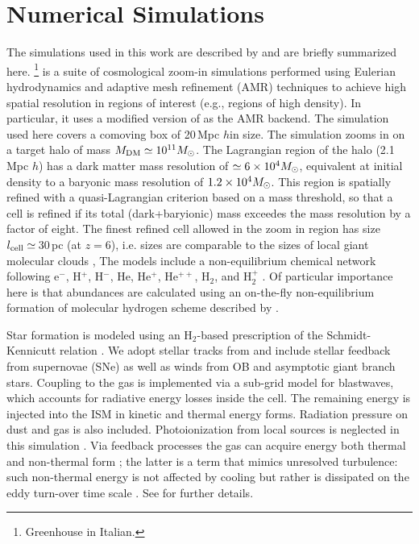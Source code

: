 \IfFileExists{emulateapjlegacy.cls}{\documentclass[iop]{emulateapjlegacy}}{\documentclass[iop]{emulateapj}}
\begin{document}
\section{Numerical Simulations}\label{sec:sim}
The simulations used in this work are described by \citealt{Pallottini17a, Pallottini17b} and are briefly summarized here.
%
\footnote{Greenhouse in Italian.} is a suite of cosmological zoom-in simulations performed using Eulerian hydrodynamics and adaptive mesh refinement (AMR) techniques to achieve high spatial resolution in regions of interest (e.g., regions of high density).
%
In particular, it uses a modified version of  \citep{Teyssier02a} as the AMR backend. The simulation used here covers a comoving box of 20\,Mpc $h$\pmOne in size. The simulation zooms in on a target halo of mass $M_{\rm DM}\simeq10^{11} \mbox{$M_{\odot}$}$. The Lagrangian region of the halo (2.1\,Mpc $h$\pmOne) has a dark matter mass resolution of $\simeq 6\times 10^4 \mbox{$M_{\odot}$}$, equivalent at initial density to a baryonic mass resolution of $1.2 \times 10^4 \mbox{$M_{\odot}$}$. This region is spatially refined with a quasi-Lagrangian criterion based on a mass threshold, so that a cell is refined if its total (dark+baryionic) mass exceedes the mass resolution by a factor of eight. The finest refined cell allowed in the zoom in region has size $l_{\rm cell}\simeq$\,30\,pc (at $z = 6$), i.e. sizes are comparable to the sizes of local giant molecular clouds \citep[e.g.,][]{Sanders85a, Federrath13a, Goodman14a},
The models include a non-equilibrium chemical network following e$^{-}$, H$^+$, H$^-$, He, He$^+$, He$^{++}$, H$_2$, and H$_2^+$ \citep{Grassi14a,Bovino16a}. Of particular importance here is that abundances are calculated using an on-the-fly non-equilibrium formation of molecular hydrogen scheme described by \citet{Pallottini17a}.

Star formation is modeled using an H$_2$-based prescription of the Schmidt-Kennicutt relation \citep{Krumholz09a}. We adopt stellar tracks from  and include stellar feedback from supernovae (SNe) as well as winds from OB and asymptotic giant branch stars. Coupling to the gas is implemented via a sub-grid model for blastwaves, which accounts for radiative energy losses inside the cell. The remaining energy is injected into the ISM in kinetic and thermal energy forms. Radiation pressure on dust and gas is also included. Photoionization from local sources is neglected in this simulation \citep[see][for its effect]{pallottini:2019,decataldo:2019}.
%
Via feedback processes the gas can acquire energy both thermal and non-thermal form \citep{agertz:2013}; the latter is a term that mimics unresolved turbulence: such non-thermal energy is not affected by cooling but rather is dissipated on the eddy turn-over time scale \citep{maclow1999turb}. See \citet{Pallottini17b} for further details.
\end{document}
